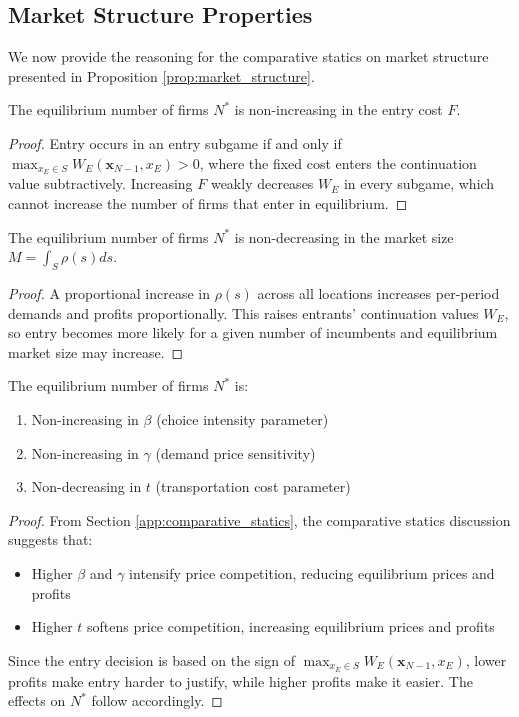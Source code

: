 \documentclass{article}
\begin{document}
\subsection{Market Structure Properties}

We now provide the reasoning for the comparative statics on market structure presented in Proposition \ref{prop:market_structure}.

\begin{proposition}
  The equilibrium number of firms $N^*$ is non-increasing in the entry cost $F$.
\end{proposition}

\begin{proof}
  Entry occurs in an entry subgame if and only if $\max_{x_E\in S} W_E(\mathbf{x}_{N-1},x_E) > 0$, where the fixed cost enters the continuation value subtractively. Increasing $F$ weakly decreases $W_E$ in every subgame, which cannot increase the number of firms that enter in equilibrium.
\end{proof}

\begin{proposition}
  The equilibrium number of firms $N^*$ is non-decreasing in the market size $M = \int_S \rho(s) ds$.
\end{proposition}

\begin{proof}
  A proportional increase in $\rho(s)$ across all locations increases per-period demands and profits proportionally. This raises entrants' continuation values $W_E$, so entry becomes more likely for a given number of incumbents and equilibrium market size may increase.
\end{proof}

\begin{proposition}
  The equilibrium number of firms $N^*$ is:
  \begin{enumerate}
    \item Non-increasing in $\beta$ (choice intensity parameter)
    \item Non-increasing in $\gamma$ (demand price sensitivity)
    \item Non-decreasing in $t$ (transportation cost parameter)
  \end{enumerate}
\end{proposition}

\begin{proof}
  From Section \ref{app:comparative_statics}, the comparative statics discussion suggests that:
  \begin{itemize}
    \item Higher $\beta$ and $\gamma$ intensify price competition, reducing equilibrium prices and profits
    \item Higher $t$ softens price competition, increasing equilibrium prices and profits
  \end{itemize}

  Since the entry decision is based on the sign of $\max_{x_E\in S} W_E(\mathbf{x}_{N-1},x_E)$, lower profits make entry harder to justify, while higher profits make it easier. The effects on $N^*$ follow accordingly.
\end{proof}

\end{document}
